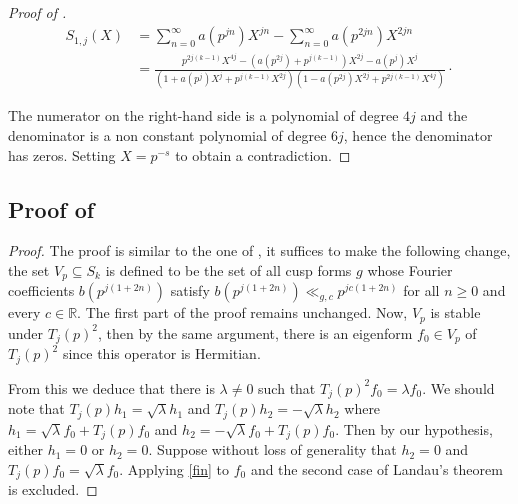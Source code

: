 \documentclass[smallcondensed]{svjour3}
\begin{document}
\begin{proof}[Proof of ]
\begin{align}
S_{1,j}(X)&=\sum_{n=0}^{\infty}a(p^{j n})X^{j n}-\sum_{n=0}^{\infty}a(p^{2 j n})X^{2jn}\\\label{fin}
&=\frac{p^{2 j (k-1)}X^{4j}-\left( a(p^{2 j})+p^{j(k-1)}\right) X^{2j}-a(p^{j})X^{j}}{\left(1+ a(p^{j})X^{j}+p^{j(k-1)}X^{2j}\right)\left(1-a(p^{2 j})X^{2j}+p^{2 j(k-1)}X^{4j}\right)}\cdot
\end{align}

The numerator on the right-hand side is a polynomial of degree $4j$ and the denominator is a non constant polynomial of degree $6j$, hence the denominator has zeros. Setting $X=p^{-s}$ to obtain a contradiction.

\end{proof}

\subsection{Proof of \texorpdfstring{}{Theorem 4}}

\begin{proof}
The proof is similar to the one of \cite[Theorem 2.2]{kohnen14}, it suffices to make the following change, the set $V_{p}\subseteq S_{k}$ is defined to be the set of all cusp forms $g$ whose Fourier coefficients $b(p^{j(1+2n)})$ satisfy $b(p^{j(1+2n)})\ll_{g,c}p^{jc(1+2n)}$ for all $n\geq 0$ and every $c\in\mathbb{R}$. The first part of the proof remains unchanged. Now, $V_p$ is stable under $T_{j}(p)^{2}$, then by the same argument, there is an eigenform $f_{0}\in V_p$ of $T_{j}(p)^{2}$ since this operator is Hermitian. 

From this we deduce that there is $\lambda\neq 0$ such that $T_{j}(p)^{2}f_{0}=\lambda f_{0}$. We should note that $T_{j}(p)h_{1}=\sqrt{\lambda}h_{1}$ and $T_{j}(p)h_{2}=-\sqrt{\lambda}h_{2}$ where $h_1=\sqrt{\lambda}f_{0}+T_{j}(p)f_{0}$ and $h_2=-\sqrt{\lambda}f_{0}+T_{j}(p)f_{0}$. Then by our hypothesis, either $h_1=0$ or $h_2=0$. Suppose without loss of generality that $h_2=0$ and $T_{j}(p)f_{0}=\sqrt{\lambda}f_{0}$. Applying \eqref{fin} to $f_0$ and the second case of Landau's theorem is excluded.
\end{proof}



\end{document}
